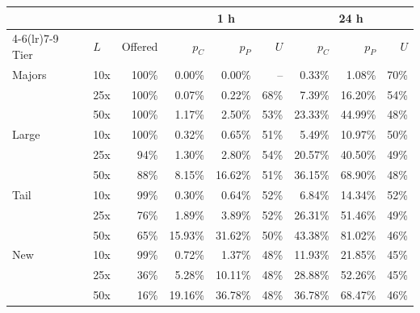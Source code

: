 \begin{tabular}{@{}llrrrrrrr@{}}
\toprule
 & & & \multicolumn{3}{c}{1 h} & \multicolumn{3}{c}{24 h} \\
\cmidrule(lr){4-6}\cmidrule(lr){7-9}
Tier & $L$ & Offered & $p_C$ & $p_P$ & $U$ & $p_C$ & $p_P$ & $U$ \\
\midrule
Majors & 10x & 100\% & 0.00\% & 0.00\% & -- & 0.33\% & 1.08\% & 70\% \\
 & 25x & 100\% & 0.07\% & 0.22\% & 68\% & 7.39\% & 16.20\% & 54\% \\
 & 50x & 100\% & 1.17\% & 2.50\% & 53\% & 23.33\% & 44.99\% & 48\% \\
\addlinespace[2pt]
Large & 10x & 100\% & 0.32\% & 0.65\% & 51\% & 5.49\% & 10.97\% & 50\% \\
 & 25x & 94\% & 1.30\% & 2.80\% & 54\% & 20.57\% & 40.50\% & 49\% \\
 & 50x & 88\% & 8.15\% & 16.62\% & 51\% & 36.15\% & 68.90\% & 48\% \\
\addlinespace[2pt]
Tail & 10x & 99\% & 0.30\% & 0.64\% & 52\% & 6.84\% & 14.34\% & 52\% \\
 & 25x & 76\% & 1.89\% & 3.89\% & 52\% & 26.31\% & 51.46\% & 49\% \\
 & 50x & 65\% & 15.93\% & 31.62\% & 50\% & 43.38\% & 81.02\% & 46\% \\
\addlinespace[2pt]
New & 10x & 99\% & 0.72\% & 1.37\% & 48\% & 11.93\% & 21.85\% & 45\% \\
 & 25x & 36\% & 5.28\% & 10.11\% & 48\% & 28.88\% & 52.26\% & 45\% \\
 & 50x & 16\% & 19.16\% & 36.78\% & 48\% & 36.78\% & 68.47\% & 46\% \\
\bottomrule
\end{tabular}
